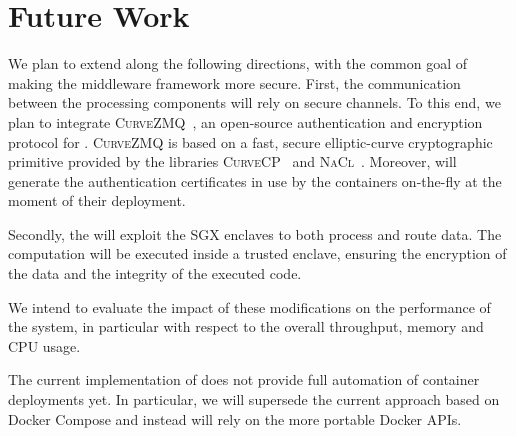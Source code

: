 \section{Future Work}\label{sec:future}
We plan to extend \SYS{} along the following directions, with the common goal of making the middleware framework more secure.
First, the communication between the processing components will rely on secure channels.
To this end, we plan to integrate \textsc{CurveZMQ}~\cite{zmq:curvezmq}, an open-source authentication and encryption protocol for \zmq{}.
\textsc{CurveZMQ} is based on a fast, secure elliptic-curve cryptographic primitive provided by the libraries \textsc{CurveCP}~\cite{zmq:curvecp} and \textsc{NaCl}~\cite{zmq:nacl}. 
Moreover, \SYS{} will generate the authentication certificates in use by the containers on-the-fly at the moment of their deployment.

Secondly, the \SYS{} will exploit the SGX enclaves to both process and route data.
The computation will be executed inside a trusted enclave, ensuring the encryption of the data and the integrity of the executed code.

We intend to evaluate the impact of these modifications on the performance of the system, in particular with respect to the overall throughput, memory and CPU usage.

The current implementation of \SYS does not provide full automation of container deployments yet.
In particular, we will supersede the current approach based on Docker Compose and instead will rely on the more portable Docker APIs.

